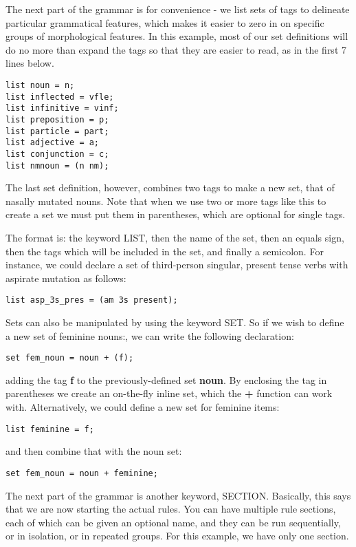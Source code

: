 \documentclass[a4paper,10pt]{article}
\begin{document}
The next part of the grammar is for convenience - we list sets of tags to delineate particular grammatical features, which makes it easier to zero in on specific groups of morphological features.  In this example, most of our set definitions will do no more than expand the tags so that they are easier to read, as in the first 7 lines below.
\begin{Verbatim}[tabsize=4]
list noun = n;
list inflected = vfle;
list infinitive = vinf;
list preposition = p;
list particle = part;
list adjective = a;
list conjunction = c;
list nmnoun = (n nm);
\end{Verbatim}
The last set definition, however, combines two tags to make a new set, that of nasally mutated nouns.  Note that when we use two or more tags like this to create a set we must put them in parentheses, which are optional for single tags.

The format is: the keyword LIST, then the name of the set, then an equals sign, then the tags which will be included in the set, and finally a semicolon.  For instance, we could declare a set of third-person singular, present tense verbs with aspirate mutation as follows:
\begin{Verbatim}[tabsize=4]
list asp_3s_pres = (am 3s present);
\end{Verbatim}

Sets can also be manipulated by using the keyword SET.  So if we wish to define a new set of feminine nouns:, we can write the following declaration:
\begin{Verbatim}[tabsize=4]
set fem_noun = noun + (f);
\end{Verbatim}
adding the tag \textbf{f} to the previously-defined set \textbf{noun}.  By enclosing the tag in parentheses we create an on-the-fly inline set, which the \textbf{+} function can work with.  Alternatively, we could define a new set for feminine items:
\begin{Verbatim}[tabsize=4]
list feminine = f;
\end{Verbatim}
and then combine that with the noun set:
\begin{Verbatim}[tabsize=4]
set fem_noun = noun + feminine;
\end{Verbatim} 

The next part of the grammar is another keyword, SECTION.  Basically, this says that we are now starting the actual rules.  You can have multiple rule sections, each of which can be given an optional name, and they can be run sequentially, or in isolation, or in repeated groups.  For this example, we have only one section.
\end{document}
